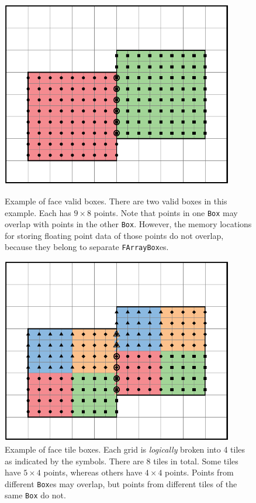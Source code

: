 {{{\begin{figure}
  \centering
  \begin{minipage}{0.45\textwidth}
    \centering
    \includegraphics[width=0.9\textwidth]{./Basics/ec_validbox.pdf}
    \caption{\label{fig:basics:ec_validbox} Example of face valid
      boxes. There are two valid boxes in this example. Each has $9
      \times 8$ points.  Note that points in one {\tt Box} may overlap
      with points in the other {\tt Box}.  However, the memory locations
      for storing floating point data of those points do not overlap,
      because they belong to separate {\tt FArrayBox}es.}
  \end{minipage}\hfill
  \begin{minipage}{0.45\textwidth}
    \centering
    \includegraphics[width=0.9\textwidth]{./Basics/ec_tilebox.pdf}
    \caption{\label{fig:basics:ec_tilebox} Example of face tile boxes.
      Each grid is {\emph{logically}} broken into 4 tiles as indicated
      by the symbols.  There are 8 tiles in total.  Some tiles have $5
      \times 4$ points, whereas others have $4 \times 4$ points.
      Points from different {\tt Box}es may overlap, but points from
      different tiles of the same {\tt Box} do not.}
  \end{minipage}
\end{figure}

}}}
